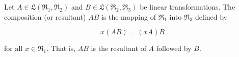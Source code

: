 Let $A \in \mathfrak{L}(\mathfrak{R}_1, \mathfrak{R}_2)$ and $B \in \mathfrak{L}(\mathfrak{R}_2, \mathfrak{R}_3)$ be linear transformations. The composition (or resultant) $AB$ is the mapping of $\mathfrak{R}_1$ into $\mathfrak{R}_3$ defined by

$$x(AB) = (xA)B$$

for all $x \in \mathfrak{R}_1$. That is, $AB$ is the resultant of $A$ followed by $B$.
